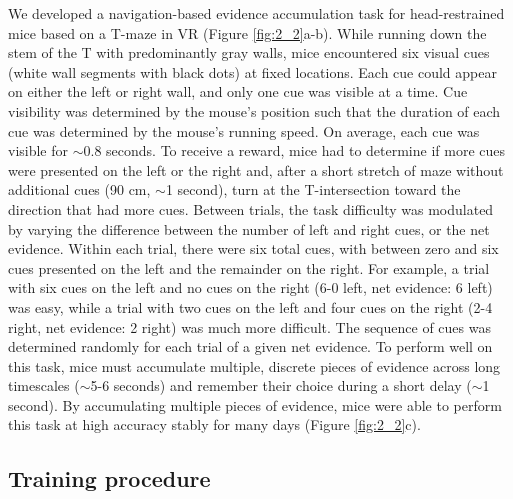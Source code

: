 We developed a navigation-based evidence accumulation task for head-restrained mice based on a T-maze in VR (Figure \ref{fig:2_2}a-b). While running down the stem of the T with predominantly gray walls, mice encountered six visual cues (white wall segments with black dots) at fixed locations. Each cue could appear on either the left or right wall, and only one cue was visible at a time. Cue visibility was determined by the mouse’s position such that the duration of each cue was determined by the mouse’s running speed. On average, each cue was visible for $\sim$0.8 seconds. To receive a reward, mice had to determine if more cues were presented on the left or the right and, after a short stretch of maze without additional cues (90 cm, $\sim$1 second), turn at the T-intersection toward the direction that had more cues. Between trials, the task difficulty was modulated by varying the difference between the number of left and right cues, or the net evidence. Within each trial, there were six total cues, with between zero and six cues presented on the left and the remainder on the right. For example, a trial with six cues on the left and no cues on the right (6-0 left, net evidence: 6 left) was easy, while a trial with two cues on the left and four cues on the right (2-4 right, net evidence: 2 right) was much more difficult. The sequence of cues was determined randomly for each trial of a given net evidence. To perform well on this task, mice must accumulate multiple, discrete pieces of evidence across long timescales ($\sim$5-6 seconds) and remember their choice during a short delay ($\sim$1 second). By accumulating multiple pieces of evidence, mice were able to perform this task at high accuracy stably for many days (Figure \ref{fig:2_2}c).

\subsection{Training procedure} \label{sec:fixed_train}

